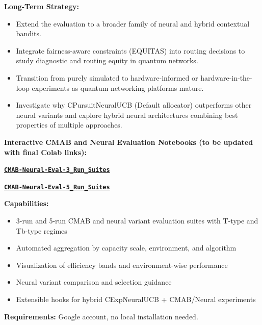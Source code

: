 \documentclass[12pt,a4paper]{article}
\newcommand{\colab}[1]{\textcolor{colabcolor}{\textbf{#1}}}
\begin{document}
\textbf{Long-Term Strategy:}
\begin{itemize}
\item Extend the evaluation to a broader family of neural and hybrid contextual bandits.
\item Integrate fairness-aware constraints (EQUITAS) into routing decisions to study diagnostic and routing equity in quantum networks.
\item Transition from purely simulated to hardware-informed or hardware-in-the-loop experiments as quantum networking platforms mature.
\item Investigate why CPursuitNeuralUCB (Default allocator) outperforms other neural variants and explore hybrid neural architectures combining best properties of multiple approaches.
\end{itemize}

\begin{tcolorbox}[colback=colabcolor!20,colframe=colabcolor,title=\textbf{Interactive Framework Access (Placeholder Links)}]

\begin{center}
\textbf{Interactive CMAB and Neural Evaluation Notebooks (to be updated with final Colab links):}
\vspace{0.3cm}

\href{https://colab.research.google.com/drive/PLACEHOLDER_3_RUNS}{\colab{\texttt{CMAB-Neural-Eval-3\_Run\_Suites}}}

\href{https://colab.research.google.com/drive/PLACEHOLDER_5_RUNS}{\colab{\texttt{CMAB-Neural-Eval-5\_Run\_Suites}}}

\vspace{0.3cm}
\textbf{Capabilities:}
\begin{itemize}
\item 3-run and 5-run CMAB and neural variant evaluation suites with T-type and Tb-type regimes
\item Automated aggregation by capacity scale, environment, and algorithm
\item Visualization of efficiency bands and environment-wise performance
\item Neural variant comparison and selection guidance
\item Extensible hooks for hybrid CExpNeuralUCB + CMAB/Neural experiments
\end{itemize}

\textbf{Requirements:} Google account, no local installation needed.
\end{center}
\end{tcolorbox}
\end{document}
